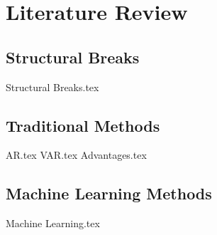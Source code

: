 \section{Literature Review}

\subsection{Structural Breaks}
{Structural Breaks.tex}

\subsection{Traditional Methods}
{AR.tex}
{VAR.tex}
{Advantages.tex}

\subsection{Machine Learning Methods}
{Machine Learning.tex}
